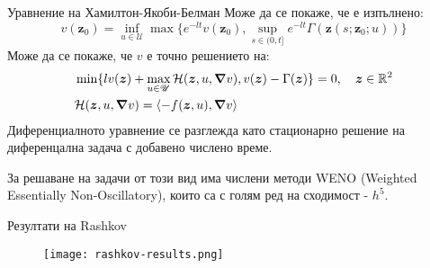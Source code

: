 \begin{frame}[t]{Уравнение на Хамилтон-Якоби-Белман}
  Може да се покаже, че е изпълнено:
  \begin{equation}
    v(\boldsymbol{z}_0) = \inf_{u \in \mathscr{U}} \max\{e^{-lt} v(\boldsymbol{z}_0), \sup_{s \in (0, t]} e^{-lt} \Gamma(\boldsymbol{z}(s; \boldsymbol{z}_0; u))\}
  \end{equation}
  Може да се покаже, че $v$ е точно решението на:
  \begin{equation}
    \begin{split}
      &\min\{l v(\boldsymbol{z}) + \max_{u \in \mathscr{U}} \mathcal{H}(\boldsymbol{z}, u, \grad{v}), v(\boldsymbol{z}) - \Gamma(\boldsymbol{z}) \} = 0, \quad \boldsymbol{z} \in \mathbb{R}^2 \\
      &\mathcal{H}(\boldsymbol{z}, u, \grad{v}) = \langle -f(\boldsymbol{z}, u), \grad{v} \rangle
    \end{split}
  \end{equation}
  Диференциалното уравнение се разглежда като стационарно решение на диференцална задача с добавено числено време.
  
  За решаване на задачи от този вид има числени методи WENO (Weighted Essentially Non-Oscillatory), които са с голям ред на сходимост - $h^5$.
\end{frame}

\begin{frame}[t]{Резултати на Rashkov}
  \begin{figure}
    \texttt{[image: rashkov-results.png]}
  \end{figure}
\end{frame}
